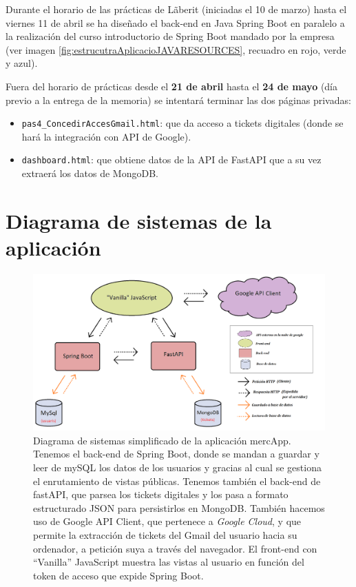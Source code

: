 \documentclass[a4paper,12pt]{report}
\begin{document}
		Durante el horario de las prácticas de Lãberit (iniciadas el 10 de marzo) hasta el viernes 11 de abril se ha diseñado el back-end en Java Spring Boot en paralelo a la realización del curso introductorio de Spring Boot mandado por la empresa (ver imagen \ref{fig:estrucutraAplicacioJAVARESOURCES}, recuadro en rojo, verde y azul).
		
		Fuera del horario de prácticas desde el \textbf{21 de abril} hasta el \textbf{24 de mayo} (día previo a la entrega de la memoria) se intentará terminar las dos páginas privadas:
		
		\begin{itemize}
			\item \texttt{pas4\_ConcedirAccesGmail.html}: que da acceso a tickets digitales (donde se hará la integración con API de Google).
			\item \texttt{dashboard.html}: que obtiene datos de la API de FastAPI que a su vez extraerá los datos de MongoDB.
		\end{itemize}

		
		
		
		

		

		
		\section{Diagrama de sistemas de la aplicación}
		
				
		\setlength{\belowcaptionskip}{3pt}
		\FloatBarrier
		\begin{figure}[H]
			\centering
			\includegraphics[width=1\textwidth]{img/diagramaSistemesAplicacioMercapp.png}
			\caption{Diagrama de sistemas simplificado de la aplicación mercApp. Tenemos el back-end de Spring Boot, donde se mandan a guardar y leer de mySQL los datos de los usuarios y gracias al cual se gestiona el enrutamiento de vistas públicas. Tenemos también el back-end de fastAPI, que parsea los tickets digitales y los pasa a formato estructurado JSON para persistirlos en MongoDB. También hacemos uso de Google API Client, que pertenece a \textit{Google Cloud}, y que permite la extracción de tickets del Gmail del usuario hacia su ordenador, a petición suya a través del navegador. El front-end con ``Vanilla'' JavaScript muestra las vistas al usuario en función del token de acceso que expide Spring Boot.}

			
			\label{fig:diagramaSistemesAplicacioMercapp} 
		\end{figure}
		\FloatBarrier
				
\end{document}
